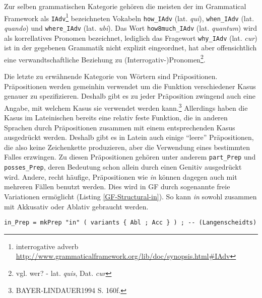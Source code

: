 \documentclass[12pt,abstract=on]{scrreprt}
\begin{document}
Zur selben grammatischen Kategorie gehören die meisten der im Grammatical Framework als \texttt{IAdv}\footnote{interrogative adverb \url{http://www.grammaticalframework.org/lib/doc/synopsis.html#IAdv}} bezeichneten Vokabeln \texttt{how\_IAdv} (lat. \textit{qui}), \texttt{when\_IAdv} (lat. \textit{quando}) und \texttt{where\_IAdv} (lat. \textit{ubi}). Das Wort \texttt{how8much\_IAdv} (lat. \textit{quantum}) wird als korrellatives Pronomen bezeichnet, lediglich das Fragewort \texttt{why\_IAdv} (lat. \textit{cur}) ist in der gegebenen Grammatik nicht explizit eingeordnet, hat aber offensichtlich eine verwandtschaftliche Beziehung zu (Interrogativ-)Pronomen\footnote {vgl. wer? -  lat. \textit{quis}, Dat. \textit{cur}}.

Die letzte zu erwähnende Kategorie von Wörtern sind Präpositionen. Präpositionen werden gemeinhin verwendet um die Funktion verschiedener Kasus genauer zu spezifizieren. Deshalb gibt es zu jeder Präposition zwingend auch eine Angabe, mit welchem Kasus sie verwendet werden kann.\footnote{BAYER-LINDAUER1994 S. 160f.} Allerdings haben die Kasus im Lateinischen bereits eine relativ feste Funktion, die in anderen Sprachen durch Präpositionen zusammen mit einem entsprechenden Kasus ausgedrückt werden. Deshalb gibt es in Latein auch einige ``leere'' Präpositionen, die also keine Zeichenkette produzieren, aber die Verwendung eines bestimmten Falles erzwingen. Zu diesen Präpositionen gehören unter anderem \texttt{part\_Prep} und \texttt{posses\_Prep}, deren Bedeutung schon allein durch einen Genitiv ausgedrückt wird. Andere, recht häufige, Präpositionen wie \textit{in} können dagegen auch mit mehreren Fällen benutzt werden. Dies wird in GF durch sogenannte freie Variationen ermöglicht (Listing \ref{GF-Structural-in}). So kann \textit{in} sowohl zusammen mit Akkusativ oder Ablativ gebraucht werden.
\begin{lstlisting}[float=ht,label={GF-Structural-in},caption={Beispiel für freie Variation}]
in_Prep = mkPrep "in" ( variants { Abl ; Acc } ) ; -- (Langenscheidts)
\end{lstlisting}

\FloatBarrier
\end{document}
